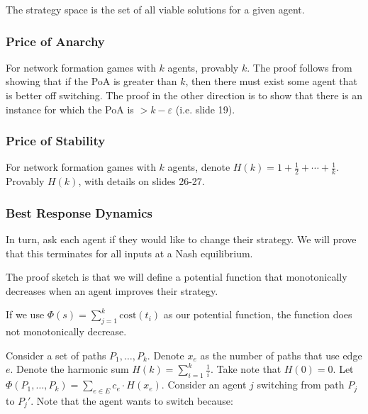\documentclass{idc_msc}
\begin{document}

The strategy space is the set of all viable solutions for a given agent.

\subsubsection{Price of Anarchy}

For network formation games with \(k\) agents, provably \(k\).
The proof follows from showing that if the PoA is greater than \(k\), then there must exist some agent that is better off switching.
The proof in the other direction is to show that there is an instance for which the PoA is \(> k - \varepsilon\) (i.e. slide 19).

\subsubsection{Price of Stability}

For network formation games with \(k\) agents, denote \(H(k)=1 + \frac{1}{2} + \cdots + \frac{1}{k}\).
Provably \(H(k)\), with details on slides 26-27.


\subsubsection{Best Response Dynamics}

In turn, ask each agent if they would like to change their strategy.
We will prove that this terminates for all inputs at a Nash equilibrium.

The proof sketch is that we will define a potential function that monotonically decreases when an agent improves their strategy.

If we use \(\Phi(s) = \sum_{j=1}^k \text{cost}(t_i)\) as our potential function, the function does not monotonically decrease.

Consider a set of paths \(P_1, \ldots, P_k\).
Denote \(x_e\) as the number of paths that use edge \(e\).
Denote the harmonic sum \(H(k) = \sum_{i=1}^k \frac{1}{i}\).
Take note that \(H(0) = 0\).
Let \(\Phi(P_1,\ldots,P_k) = \sum_{e \in E} c_e \cdot H(x_e)\).
Consider an agent \(j\) switching from path \(P_j\) to \(P_j'\).
Note that the agent wants to switch because:
\end{document}
